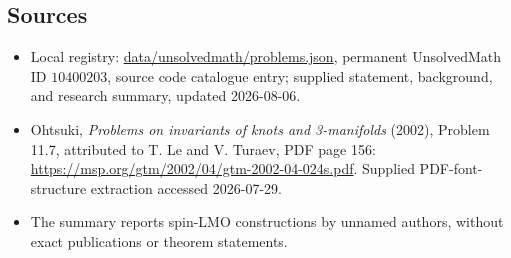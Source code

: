 \documentclass[11pt]{article}
\begin{document}
\subsection{Sources}
\begin{itemize}
\item Local registry: \url{data/unsolvedmath/problems.json}, permanent UnsolvedMath ID \(10400203\), source code catalogue entry; supplied statement, background, and research summary, updated 2026-08-06.
\item Ohtsuki, \emph{Problems on invariants of knots and 3-manifolds} (2002), Problem 11.7, attributed to T. Le and V. Turaev, PDF page 156: \url{https://msp.org/gtm/2002/04/gtm-2002-04-024s.pdf}. Supplied PDF-font-structure extraction accessed 2026-07-29.
\item The summary reports spin-LMO constructions by unnamed authors, without exact publications or theorem statements.
\end{itemize}
\end{document}
